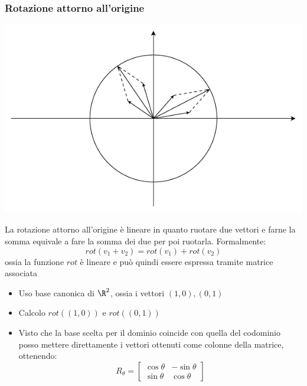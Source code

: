 \documentclass[12pt,a4paper,oneside]{article}
\begin{document}
\subsubsection*{Rotazione attorno all'origine}
\begin{center}
	\includegraphics{Images/Rotazione.pdf}
\end{center}
La rotazione attorno all'origine è lineare in quanto ruotare due vettori e farne la somma equivale a fare la somma dei due per poi ruotarla. Formalmente:
\[
	rot\left( v_1+v_2 \right) = rot\left( v_1 \right)  + rot\left( v_2 \right)
\]
ossia la funzione $ rot $ è lineare e può quindi essere espressa tramite matrice associata
\begin{itemize}
	\item Uso base canonica di $ \R^{2} $, ossia i vettori $ \left( 1,0 \right) , \left( 0,1 \right)  $
	\item Calcolo $ rot\left( \left( 1,0 \right)  \right)  $ e $ rot\left( \left( 0,1 \right)  \right)  $
	\item Visto che la base scelta per il dominio coincide con quella del codominio posso mettere direttamente i vettori ottenuti come colonne della matrice, ottenendo:
	      \[
		      R_{\theta }=\begin{bmatrix}
			      \cos \theta & - \sin \theta \\
			      \sin \theta & \cos \theta
		      \end{bmatrix}
	      \]
\end{itemize}
\end{document}

